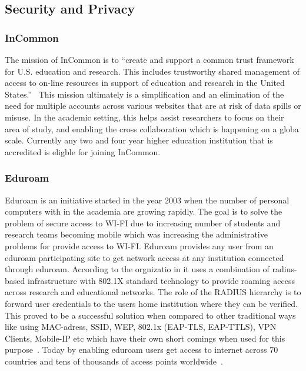 {\subsection{Security and Privacy}

\subsubsection{InCommon \cv}

The mission of InCommon is to ``create and support a common trust
framework for U.S. education and research.  This includes trustworthy
shared management of access to on-line resources in support of
education and research in the United States.''~\cite{www-incommon}
This mission ultimately is a simplification and an elimination of the
need for multiple accounts across various websites that are at risk of
data spills or misuse.  In the academic setting, this helps assist
researchers to focus on their area of study, and enabling the cross
collaboration which is happening on a globa scale.  Currently any two
and four year higher education institution that is accredited is
eligble for joining InCommon.

\subsubsection{Eduroam}

Eduroam is an initiative started in the year 2003 when the number of
personal computers with in the academia are growing rapidly. The goal
is to solve the problem of secure access to WI-FI due to increasing
number of students and research teams becoming mobile which was
increasing the administrative problems for provide access to
WI-FI. Eduroam provides any user from an eduroam participating site to
get network access at any institution connected through
eduroam. According to the orgnizatio in it uses a combination of
radius-based infrastructure with 802.1X standard technology to provide
roaming access across research and educational networks. The role of
the RADIUS hierarchy is to forward user credentials to the users home
institution where they can be verified. This proved to be a successful
solution when compared to other traditional ways like using
MAC-adress, SSID, WEP, 802.1x (EAP-TLS, EAP-TTLS), VPN Clients,
Mobile-IP etc which have their own short comings when used for this
purpose~\cite{eduroam-paper-2005}. Today by enabling eduroam users get
access to internet across 70 countries and tens of thousands of access
points worldwide~\cite{www-eduroam}.


}
